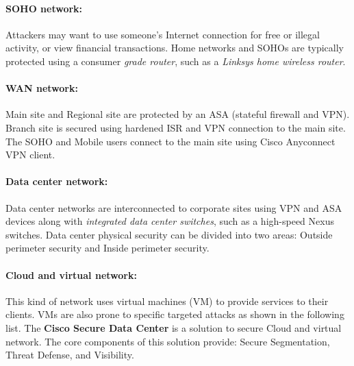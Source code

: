 %

\paragraph{SOHO network:} Attackers may want to use someone's Internet connection for free or illegal activity, or view financial transactions. Home networks and SOHOs are typically protected using a consumer \emph{grade router}, such as a \emph{Linksys home wireless router}. 

\paragraph{WAN network:} Main site and Regional site are protected by an ASA (stateful firewall and VPN). Branch site is secured using hardened ISR and VPN connection to the main site. The SOHO and Mobile users connect to the main site using Cisco Anyconnect VPN client. 

\paragraph{Data center network:} Data center networks are interconnected to corporate sites using VPN and ASA devices along with \emph{integrated data center switches}, such as a high-speed Nexus switches. Data center physical security can be divided into two areas: Outside perimeter security and Inside perimeter security. 

\paragraph{Cloud and virtual network:} This kind of network uses virtual machines (VM) to provide services to their clients.  VMs are also prone to specific targeted attacks as shown in the following list. The \textbf{Cisco Secure Data Center} is a solution to secure Cloud and virtual network. The core components of this solution provide: Secure Segmentation, Threat Defense, and Visibility.

